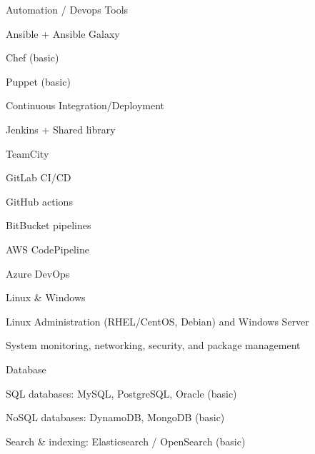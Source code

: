 \begin{cvskills}
  \cvskill
    {Automation / Devops Tools} %
    {
      \begin{cvitems} %
        \item {Ansible + Ansible Galaxy} %
        \item {Chef (basic)} %
        \item {Puppet (basic)} %
      \end{cvitems}
    }

  \cvskill
    {Continuous Integration/Deployment} %
    {
      \begin{cvitems} %
        \item {Jenkins + Shared library} %
        \item {TeamCity} %
        \item {GitLab CI/CD} %
        \item {GitHub actions} %
        \item {BitBucket pipelines} %
        \item {AWS CodePipeline} %
        \item {Azure DevOps} %
      \end{cvitems}
    }

  \cvskill
    {Linux \& Windows} %
    {
      \begin{cvitems} %
        \item {Linux Administration (RHEL/CentOS, Debian) and Windows Server} %
        \item {System monitoring, networking, security, and package management} %
      \end{cvitems}
    }

  \cvskill
    {Database} %
    {
      \begin{cvitems} %
        \item {SQL databases: MySQL, PostgreSQL, Oracle (basic)} %
        \item {NoSQL databases: DynamoDB, MongoDB (basic)} %
        \item {Search \& indexing: Elasticsearch / OpenSearch (basic)} %
      \end{cvitems}
    }


\end{cvskills}
